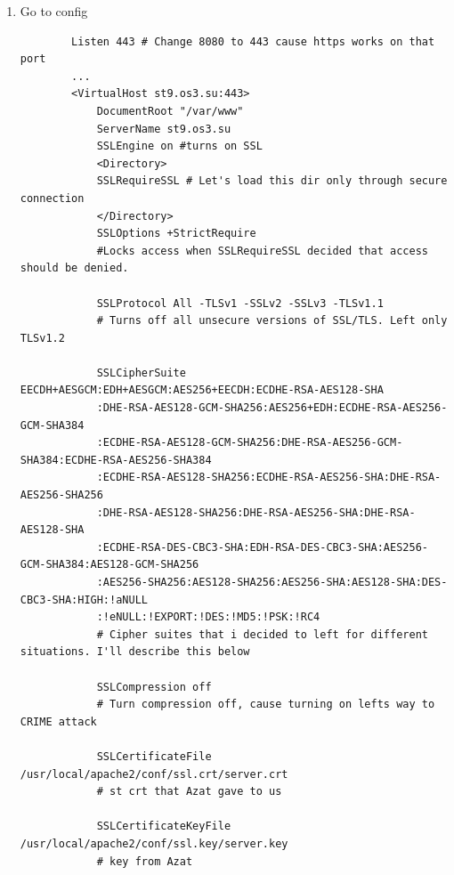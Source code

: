 \documentclass[10pt]{article}
\begin{document}
\begin{enumerate}
    \item Go to config
    \begin{verbatim}
        Listen 443 # Change 8080 to 443 cause https works on that port
        ...
        <VirtualHost st9.os3.su:443>
            DocumentRoot "/var/www"
            ServerName st9.os3.su
            SSLEngine on #turns on SSL
            <Directory>
            SSLRequireSSL # Let's load this dir only through secure connection
            </Directory>
            SSLOptions +StrictRequire 
            #Locks access when SSLRequireSSL decided that access should be denied.
            
            SSLProtocol All -TLSv1 -SSLv2 -SSLv3 -TLSv1.1
            # Turns off all unsecure versions of SSL/TLS. Left only TLSv1.2
            
            SSLCipherSuite EECDH+AESGCM:EDH+AESGCM:AES256+EECDH:ECDHE-RSA-AES128-SHA
            :DHE-RSA-AES128-GCM-SHA256:AES256+EDH:ECDHE-RSA-AES256-GCM-SHA384
            :ECDHE-RSA-AES128-GCM-SHA256:DHE-RSA-AES256-GCM-SHA384:ECDHE-RSA-AES256-SHA384
            :ECDHE-RSA-AES128-SHA256:ECDHE-RSA-AES256-SHA:DHE-RSA-AES256-SHA256
            :DHE-RSA-AES128-SHA256:DHE-RSA-AES256-SHA:DHE-RSA-AES128-SHA
            :ECDHE-RSA-DES-CBC3-SHA:EDH-RSA-DES-CBC3-SHA:AES256-GCM-SHA384:AES128-GCM-SHA256
            :AES256-SHA256:AES128-SHA256:AES256-SHA:AES128-SHA:DES-CBC3-SHA:HIGH:!aNULL
            :!eNULL:!EXPORT:!DES:!MD5:!PSK:!RC4
            # Cipher suites that i decided to left for different situations. I'll describe this below
            
            SSLCompression off 
            # Turn compression off, cause turning on lefts way to CRIME attack
            
            SSLCertificateFile /usr/local/apache2/conf/ssl.crt/server.crt 
            # st crt that Azat gave to us
            
            SSLCertificateKeyFile /usr/local/apache2/conf/ssl.key/server.key 
            # key from Azat
            

\end{verbatim}
\end{enumerate}
\end{document}
